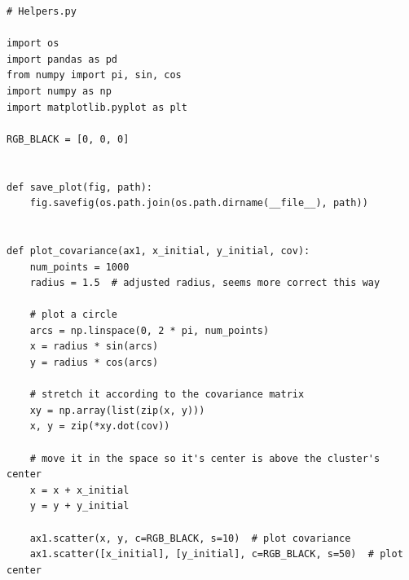 \begin{lstlisting}[style=py]
# Helpers.py

import os
import pandas as pd
from numpy import pi, sin, cos
import numpy as np
import matplotlib.pyplot as plt

RGB_BLACK = [0, 0, 0]


def save_plot(fig, path):
    fig.savefig(os.path.join(os.path.dirname(__file__), path))


def plot_covariance(ax1, x_initial, y_initial, cov):
    num_points = 1000
    radius = 1.5  # adjusted radius, seems more correct this way

    # plot a circle
    arcs = np.linspace(0, 2 * pi, num_points)
    x = radius * sin(arcs)
    y = radius * cos(arcs)

    # stretch it according to the covariance matrix
    xy = np.array(list(zip(x, y)))
    x, y = zip(*xy.dot(cov))

    # move it in the space so it's center is above the cluster's center
    x = x + x_initial
    y = y + y_initial

    ax1.scatter(x, y, c=RGB_BLACK, s=10)  # plot covariance
    ax1.scatter([x_initial], [y_initial], c=RGB_BLACK, s=50)  # plot center

\end{lstlisting}



\begin{lstlisting}[style=py]

\end{lstlisting}



\begin{lstlisting}[style=py]

\end{lstlisting}



\begin{lstlisting}[style=py]

\end{lstlisting}



\begin{lstlisting}[style=py]

\end{lstlisting}



\begin{lstlisting}[style=py]

\end{lstlisting}



